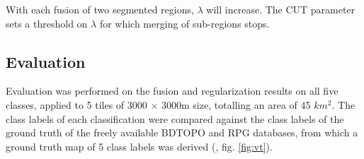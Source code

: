 \documentclass[10pt]{article}
\begin{document}
With each fusion of two segmented regions, $\lambda$ will increase. The CUT parameter sets a threshold on $\lambda$ for which merging of sub-regions stops.

\subsection{Evaluation}

Evaluation was performed on the fusion and regularization results on all five classes, applied to 5 tiles of 3000 $\times$ 3000m size, totalling an area of 45 $km^2$. The class labels of each classification were compared against the class labels of the ground truth of the freely available BDTOPO and RPG databases, from which a ground truth map of 5 class labels was derived (\cite{bdtopo,RPG}, fig. \ref{fig:vt}).%
\end{document}
